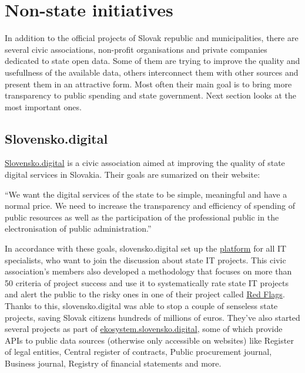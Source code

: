 \documentclass[thesis=B,english]{sprlajur-slovakopendata}[2018/05/12]
\begin{document}
\section{Non-state initiatives}
\label{non-state-initiatives}
In addition to the official projects of Slovak republic and municipalities, there are several civic associations, non-profit organisations and private companies dedicated to state open data. Some of them are trying to improve the quality and usefullness of the available data, others interconnect them with other sources and present them in an attractive form. Most often their main goal is to bring more transparency to public spending and state government. Next section looks at the most important ones.
\subsection{Slovensko.digital}
\label{slovensko.digital}
\href{https://slovensko.digital}{Slovensko.digital} is a civic association aimed at improving the quality of state digital services in Slovakia. 
Their goals are sumarized on their website:
\begin{displayquote}
	``We want the digital services of the state to be simple, meaningful and have a normal price. We need to increase the transparency and efficiency of spending of public resources as well as the participation of the professional public in the electronisation of public administration.''
\end{displayquote}
In accordance with these goals, slovensko.digital set up the \href{https://platforma.slovensko.digital}{platform} for all IT specialists, who want to join the discussion about state IT projects. This civic association's members also developed a methodology that focuses on more than 50 criteria of project success and use it to systematically rate state IT projects and alert the public to the risky ones in one of their project called \href{https://redflags.slovensko.digital/}{Red Flags}. Thanks to this, slovensko.digital was able to stop a couple of senseless state projects, saving Slovak citizens hundreds of millions of euros. They've also started several projects as part of \href{https://ekosystem.slovensko.digital/}{ekosystem.slovensko.digital}, some of which provide APIs to public data sources (otherwise only accessible on websites) like Register of legal entities, Central register of contracts, Public procurement journal, Business journal, Registry of financial statements and more. 
\end{document}
